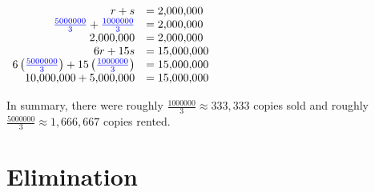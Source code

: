 \documentclass[nooutcomes]{ximera}
\begin{document}
\begin{example}
\begin{explanation}
\begin{center}
$
      \begin{array}{rl}
          r+s &=2{,}000{,}000\\ 
          {\color{blue}{{\frac{5000000}{3}}}}+{\color{blue}{{\frac{1000000}{3}}}} &=2{,}000{,}000\\ 
          2{,}000{,}000&=2{,}000{,}000\\
6r+15s &=15{,}000{,}000\\
6\left({\color{blue}{{\frac{5000000}{3}}}}\right)+15\left({\color{blue}{{\frac{1000000}{3}}}}\right) &=15{,}000{,}000\\
 10{,}000{,}000+5{,}000{,}000 & =15{,}000{,}000
      \end{array}
$
\end{center}
        In summary, there were roughly
        $\frac{1000000}{3} \approx 333{,}333$ copies sold and roughly $\frac{5000000}{3} \approx 1{,}666{,}667$ copies rented.
        \end{explanation}
\end{example}



\section{Elimination}
\end{document}
